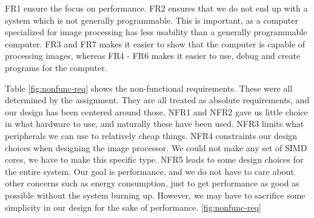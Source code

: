{\sc FR1} ensure the focus on performance. {\sc FR2} ensures that we do not end
up with a system which is not generally programmable. This is important, as a
computer specialized for image processing has less usability than a generally
programmable computer. {\sc FR3} and {\sc FR7} makes it easier to show that the
computer is capable of processing images, whereas {\sc FR4 - FR6} makes it
easier to use, debug and create programs for the computer.



Table \ref{fig:nonfunc-req} shows the non-functional requirements. These were
all determined by the assignment. They are all treated as absolute requirements,
and our design has been centered around those. {\sc NFR1} and {\sc NFR2} gave us
little choice in what hardware to use, and naturally these have been used. {\sc
  NFR3} limits what peripherals we can use to relatively cheap
things. {\sc NFR4} constraints our
design choices when designing the image processor. We could not make any set of
SIMD cores, we have to make this specific type. {\sc NFR5} leads to some
design choices for the entire system. Our goal is performance, and we do not
have to care about other concerns such as energy consumption, just to
get performance as good as possible without the system
burning up. However, we may have to sacrifice some simplicity in our design for
the sake of performance.  \ref{fig:nonfunc-req} 
